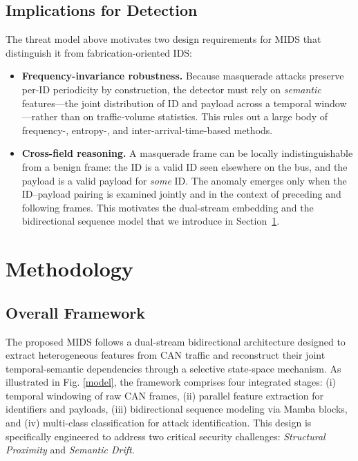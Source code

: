 \documentclass[lettersize,journal]{IEEEtran}
\begin{document}
\subsection{Implications for Detection}
\label{subsec:implications}

The threat model above motivates two design requirements for MIDS that distinguish it from fabrication-oriented IDS:
\begin{itemize}[leftmargin=*, nosep]
\item \textbf{Frequency-invariance robustness.} Because masquerade attacks preserve per-ID periodicity by construction, the detector must rely on \emph{semantic} features---the joint distribution of ID and payload across a temporal window---rather than on traffic-volume statistics. This rules out a large body of frequency-, entropy-, and inter-arrival-time-based methods.
\item \textbf{Cross-field reasoning.} A masquerade frame can be locally indistinguishable from a benign frame: the ID is a valid ID seen elsewhere on the bus, and the payload is a valid payload for \emph{some} ID. The anomaly emerges only when the ID--payload pairing is examined jointly and in the context of preceding and following frames. This motivates the dual-stream embedding and the bidirectional sequence model that we introduce in Section~\ref{sec:method}.
\end{itemize}

\section{Methodology}
\label{sec:method}

\subsection{Overall Framework}
The proposed MIDS follows a dual-stream bidirectional architecture designed to extract heterogeneous features from CAN traffic and reconstruct their joint temporal-semantic dependencies through a selective state-space mechanism. As illustrated in Fig. \ref{model}, the framework comprises four integrated stages: (i) temporal windowing of raw CAN frames, (ii) parallel feature extraction for identifiers and payloads, (iii) bidirectional sequence modeling via Mamba blocks, and (iv) multi-class classification for attack identification. This design is specifically engineered to address two critical security challenges: \textit{Structural Proximity} and \textit{Semantic Drift}.
\end{document}

